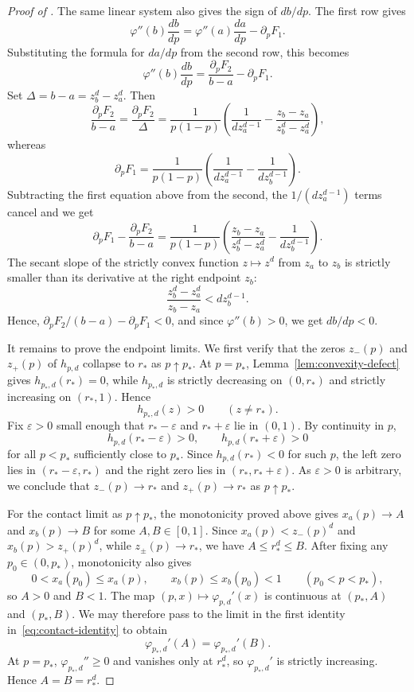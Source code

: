 \begin{proof}[Proof of ]
The same linear system also gives the sign of $db/dp$.  The first row gives
\[
  \varphi''(b)\frac{db}{dp}
  =
  \varphi''(a)\frac{da}{dp}-\partial_pF_1.
\]
Substituting the formula for $da/dp$ from the second row, this becomes
\[
  \varphi''(b)\frac{db}{dp}
  =
  \frac{\partial_pF_2}{b-a}-\partial_pF_1.
\]
Set $\Delta=b-a=z_b^d-z_a^d$.  Then
\[
  \frac{\partial_pF_2}{b-a}
  =
  \frac{\partial_pF_2}{\Delta}
  =
  \frac1{p(1-p)}
  \left(
    \frac1{d z_a^{d-1}}
    -\frac{z_b-z_a}{z_b^d-z_a^d}
  \right),
\]
whereas
\[
  \partial_pF_1
  =
  \frac1{p(1-p)}
  \left(
    \frac1{d z_a^{d-1}}
    -\frac1{d z_b^{d-1}}
  \right).
\]
Subtracting the first equation above from the second, the
$1/(d z_a^{d-1})$ terms cancel and we get
\[
  \partial_pF_1-\frac{\partial_pF_2}{b-a}
  =
  \frac1{p(1-p)}
  \left(
    \frac{z_b-z_a}{z_b^d-z_a^d}
    -\frac1{d z_b^{d-1}}
  \right).
\]
The secant slope of the strictly convex function $z\mapsto z^d$ from $z_a$ to
$z_b$ is strictly smaller than its derivative at the right endpoint $z_b$:
\[
  \frac{z_b^d-z_a^d}{z_b-z_a}<d z_b^{d-1}.
\]
Hence, $\partial_pF_2/(b-a)-\partial_pF_1<0$, and since $\varphi''(b)>0$, we get
$db/dp<0$.

It remains to prove the endpoint limits.  We first verify that the zeros
$z_-(p)$ and $z_+(p)$ of $h_{p,d}$ collapse to
$r_*$ as $p\uparrow p_*$.  At $p=p_*$, Lemma~\ref{lem:convexity-defect} gives
$h_{p_*,d}(r_*)=0$, while $h_{p_*,d}$ is strictly decreasing on $(0,r_*)$ and
strictly increasing on $(r_*,1)$.  Hence
\[
  h_{p_*,d}(z)>0\qquad (z\ne r_*).
\]
Fix $\varepsilon>0$ small enough that $r_*-\varepsilon$ and
$r_*+\varepsilon$ lie in $(0,1)$.  By
continuity in $p$,
\[
  h_{p,d}(r_*-\varepsilon)>0,
  \qquad
  h_{p,d}(r_*+\varepsilon)>0
\]
for all $p<p_*$ sufficiently close to $p_*$.  Since $h_{p,d}(r_*)<0$ for such
$p$, the left zero lies in $(r_*-\varepsilon,r_*)$ and the right zero lies in
$(r_*,r_*+\varepsilon)$.  As $\varepsilon>0$ is arbitrary, we conclude that
$z_-(p)\to r_*$ and $z_+(p)\to r_*$ as $p\uparrow p_*$.

For the contact limit as $p\uparrow p_*$, the monotonicity proved above gives
$x_a(p)\to A$ and $x_b(p)\to B$ for some $A,B\in[0,1]$.
Since $x_a(p)<z_-(p)^d$ and $x_b(p)>z_+(p)^d$, while
$z_\pm(p)\to r_*$, we have $A\le r_*^d\le B$.
After fixing any $p_0\in(0,p_*)$, monotonicity also gives
\[
  0<x_a(p_0)\le x_a(p),
  \qquad
  x_b(p)\le x_b(p_0)<1
  \qquad (p_0<p<p_*),
\]
so $A>0$ and $B<1$.  The map $(p,x)\mapsto\varphi_{p,d}'(x)$ is continuous
at $(p_*,A)$ and $(p_*,B)$.  We may therefore pass to the limit in the
first identity in~\eqref{eq:contact-identity} to obtain
\[
  \varphi_{p_*,d}'(A)=\varphi_{p_*,d}'(B).
\]
At $p=p_*$, $\varphi_{p_*,d}''\ge0$ and vanishes only at $r_*^d$, so
$\varphi_{p_*,d}'$ is strictly increasing.  Hence
$A=B=r_*^d$.


\end{proof}
